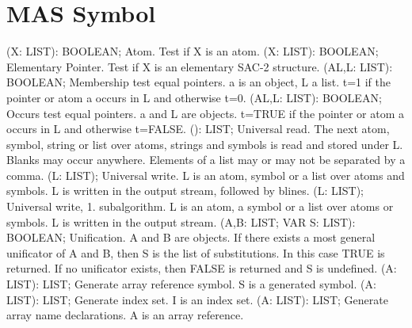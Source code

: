\section{ MAS Symbol  } 
 (X: LIST): BOOLEAN; \eproc
\bcom Atom. Test if X is an atom.  \ecom 
{} (X: LIST): BOOLEAN; \eproc
\bcom Elementary Pointer. Test if X is an elementary SAC-2 structure.  \ecom 
{} (AL,L: LIST): BOOLEAN; \eproc
\bcom Membership test equal pointers. a is an object, L a list. t=1 if
the pointer or atom a occurs in L and otherwise t=0. \ecom 
{} (AL,L: LIST): BOOLEAN; \eproc
\bcom Occurs test equal pointers. a and L are objects. t=TRUE if
the pointer or atom a occurs in L and otherwise t=FALSE.  \ecom 
{} (): LIST; \eproc
\bcom Universal read. The next atom, symbol, string or list over atoms,
strings and symbols is read and stored under L. Blanks may occur 
anywhere. Elements of a list may or may not be separated by a comma. \ecom 
{} (L: LIST); \eproc
\bcom Universal write. L is an atom, symbol or a list over
atoms and symbols. L is written in the output stream,
followed by blines.  \ecom 
{} (L: LIST); \eproc
\bcom Universal write, 1. subalgorithm. L is an atom, a symbol
or a list over atoms or symbols. L is written in the output
stream.  \ecom 
{} (A,B: LIST; VAR S: LIST): BOOLEAN; \eproc
\bcom Unification. A and B are objects. If there exists a
most general unificator of A and B, then S is the list of 
substitutions. In this case TRUE is returned. If no unificator
exists, then FALSE is returned and S is undefined.  \ecom 
{} (A: LIST): LIST; \eproc
\bcom Generate array reference symbol. S is a generated symbol.  \ecom 
{} (A: LIST): LIST; \eproc
\bcom Generate index set. I is an index set.  \ecom 
{} (A: LIST): LIST; \eproc
\bcom Generate array name declarations. A is an array reference.  \ecom 
